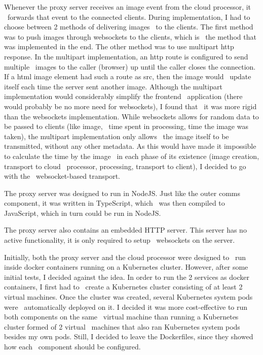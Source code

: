 Whenever the proxy server receives an image event from the cloud processor, it \
forwards that event to the connected clients.
During implementation, I had to choose between 2 methods of delivering images \
to the clients.
The first method was to push images through websockets to the clients, which is \
the method that was implemented in the end.
The other method was to use multipart http response.
In the multipart implementation, an http route is configured to send multiple \
images to the caller (browser) up until the caller closes the connection.
If a html image element had such a route as src, then the image would \
update itself each time the server sent another image.
Although the multipart implementation would considerably simplify the frontend \
application (there would probably be no more need for websockets), I found that \
it was more rigid than the websockets implementation.
While websockets allows for random data to be passed to clients (like image, \
time spent in processing, time the image was taken), the multipart implementation only allows \
the image itself to be transmitted, without any other metadata.
As this would have made it impossible to calculate the time by the image \
in each phase of its existence (image creation, transport to cloud \
processor, processing, transport to client), I decided to go with the \
websocket-based transport.

The proxy server was designed to run in NodeJS.
Just like the outer comms component, it was written in TypeScript, which \
was then compiled to JavaScript, which in turn could be run in NodeJS.

The proxy server also contains an embedded HTTP server.
This server has no active functionality, it is only required to setup \
websockets on the server.

Initially, both the proxy server and the cloud processor were designed to \
run inside docker containers running on a Kubernetes cluster.
However, after some initial tests, I decided against the idea.
In order to run the 2 services as docker containers, I first had to \
create a Kubernetes cluster consisting of at least 2 virtual machines.
Once the cluster was created, several Kubernetes system pods were \
automatically deployed on it.
I decided it was more cost-effective to run both components on the same \
virtual machine than running a Kubernetes cluster formed of 2 virtual \
machines that also ran Kubernetes system pods besides my own pods.
Still, I decided to leave the Dockerfiles, since they showed how each \
component should be configured.



